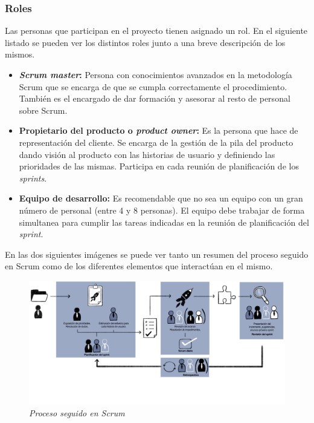 \subsubsection{Roles}
Las personas que participan en el proyecto tienen asignado un rol. En el siguiente listado se pueden ver los distintos roles junto a una breve descripción de los mismos.
\begin{itemize}
\item \textbf{\textit{Scrum master}:}
Persona con conocimientos avanzados en la metodología Scrum que se encarga de que se cumpla correctamente el procedimiento. También es el encargado de dar formación y asesorar al resto de personal sobre Scrum.

\item \textbf{Propietario del producto o \textit{product owner}:}
Es la persona que hace de representación del cliente. Se encarga de la gestión de la pila del producto dando visión al producto con las historias de usuario y definiendo las prioridades de las mismas. Participa en cada reunión de planificación de los \textit{sprints}.

\item \textbf{Equipo de desarrollo:}
Es recomendable que no sea un equipo con un gran número de personal (entre 4 y 8 personas). El equipo debe trabajar de forma simultanea para cumplir las tareas indicadas en la reunión de planificación del \textit{sprint}.
\end{itemize}

En las dos siguientes imágenes se puede ver tanto un resumen del proceso seguido en Scrum como de los diferentes elementos que interactúan en el mismo.
\begin{figure}[h]
	\centering
	\includegraphics[width=\textwidth]{../img/Scrum/Scrum.png}
	\caption{\textit{Proceso seguido en Scrum \cite{scrum}}}
\end{figure}
\FloatBarrier

